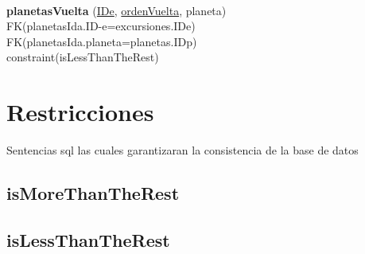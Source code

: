 \documentclass[a4paper,10pt]{article}
\newcommand\tab[1][1cm]{\hspace*{#1}}
\begin{document}
\paragraph{}
{\bf planetasVuelta} (\underline{IDe}, \underline{ordenVuelta}, planeta)\\
\tab FK(planetasIda.ID-e=excursiones.IDe)\\
\tab FK(planetasIda.planeta=planetas.IDp)\\
\tab constraint(isLessThanTheRest)

\pagebreak

\section{Restricciones}
Sentencias sql las cuales garantizaran la consistencia de la base de datos
\subsection{isMoreThanTheRest}
\begin{scriptsize}
  
\end{scriptsize}
\pagebreak
\subsection{isLessThanTheRest}
\begin{scriptsize}
  
\end{scriptsize}
\end{document}
